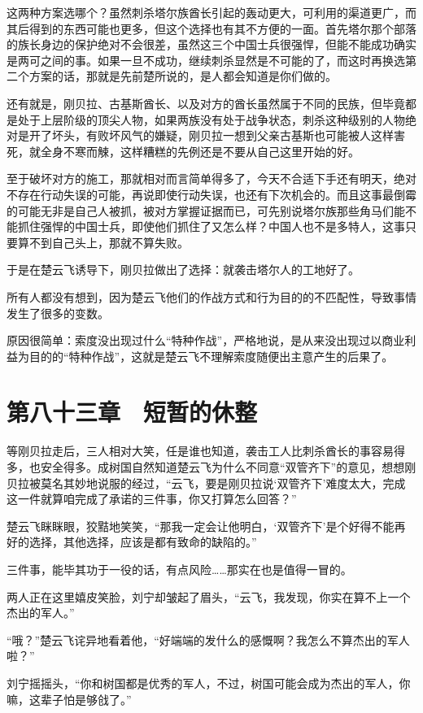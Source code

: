 这两种方案选哪个？虽然刺杀塔尔族酋长引起的轰动更大，可利用的渠道更广，而其后得到的东西可能也更多，但这个选择也有其不方便的一面。首先塔尔那个部落的族长身边的保护绝对不会很差，虽然这三个中国士兵很强悍，但能不能成功确实是两可之间的事。如果一旦不成功，继续刺杀显然是不可能的了，而这时再换选第二个方案的话，那就是先前楚所说的，是人都会知道是你们做的。

还有就是，刚贝拉、古基斯酋长、以及对方的酋长虽然属于不同的民族，但毕竟都是处于上层阶级的顶尖人物，如果两族没有处于战争状态，刺杀这种级别的人物绝对是开了坏头，有败坏风气的嫌疑，刚贝拉一想到父亲古基斯也可能被人这样害死，就全身不寒而觫，这样糟糕的先例还是不要从自己这里开始的好。

至于破坏对方的施工，那就相对而言简单得多了，今天不合适下手还有明天，绝对不存在行动失误的可能，再说即使行动失误，也还有下次机会的。而且这事最倒霉的可能无非是自己人被抓，被对方掌握证据而已，可先别说塔尔族那些角马们能不能抓住强悍的中国士兵，即使他们抓住了又怎么样？中国人也不是多特人，这事只要算不到自己头上，那就不算失败。

于是在楚云飞诱导下，刚贝拉做出了选择：就袭击塔尔人的工地好了。

所有人都没有想到，因为楚云飞他们的作战方式和行为目的的不匹配性，导致事情发生了很多的变数。

原因很简单：索度没出现过什么“特种作战”，严格地说，是从来没出现过以商业利益为目的的“特种作战”，这就是楚云飞不理解索度随便出主意产生的后果了。

\section{第八十三章　短暂的休整}

等刚贝拉走后，三人相对大笑，任是谁也知道，袭击工人比刺杀酋长的事容易得多，也安全得多。成树国自然知道楚云飞为什么不同意“双管齐下”的意见，想想刚贝拉被莫名其妙地说服的经过，“云飞，要是刚贝拉说‘双管齐下’难度太大，完成这一件就算咱完成了承诺的三件事，你又打算怎么回答？”

楚云飞眯眯眼，狡黠地笑笑，“那我一定会让他明白，‘双管齐下’是个好得不能再好的选择，其他选择，应该是都有致命的缺陷的。”

三件事，能毕其功于一役的话，有点风险……那实在也是值得一冒的。

两人正在这里嬉皮笑脸，刘宁却皱起了眉头，“云飞，我发现，你实在算不上一个杰出的军人。”

“哦？”楚云飞诧异地看着他，“好端端的发什么的感慨啊？我怎么不算杰出的军人啦？”

刘宁摇摇头，“你和树国都是优秀的军人，不过，树国可能会成为杰出的军人，你嘛，这辈子怕是够戗了。”

